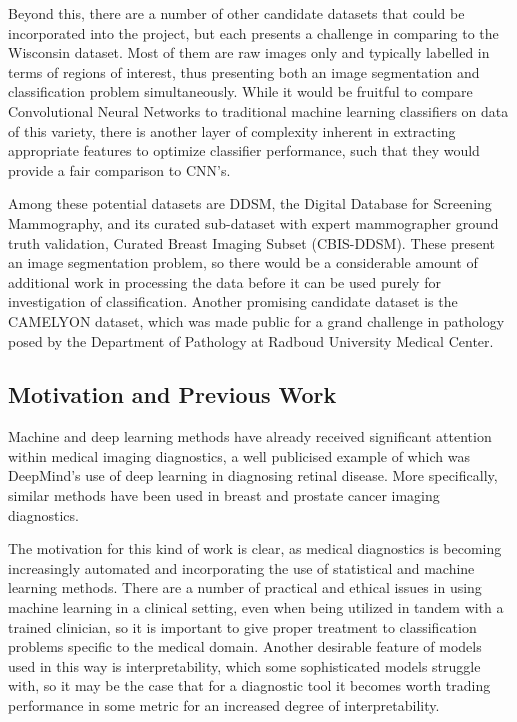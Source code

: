 \documentclass[11pt]{article}
\begin{document}
Beyond this, there are a number of other candidate datasets that could be incorporated into the project, but each presents a challenge in comparing to the Wisconsin dataset. Most of them are raw images only and typically labelled in terms of regions of interest, thus presenting both an image segmentation and classification problem simultaneously. While it would be fruitful to compare Convolutional Neural Networks to traditional machine learning classifiers on data of this variety, there is another layer of complexity inherent in extracting appropriate features to optimize classifier performance, such that they would provide a fair comparison to CNN's. 

Among these potential datasets are DDSM, the Digital Database for Screening Mammography, and its curated sub-dataset with expert mammographer ground truth validation, Curated Breast Imaging Subset (CBIS-DDSM). \cite{lee2017curated} These present an image segmentation problem, so there would be a considerable amount of additional work in processing the data before it can be used purely for investigation of classification. Another promising candidate dataset is the CAMELYON dataset, which was made public for a grand challenge in pathology posed by the Department of Pathology at Radboud University Medical Center. \cite{litjens20181399}

\subsection*{Motivation and Previous Work}
Machine and deep learning methods have already received significant attention within medical imaging diagnostics, a well publicised example of which was DeepMind's use of deep learning in diagnosing retinal disease. \cite{de2018clinically} More specifically, similar methods have been used in breast and prostate cancer imaging diagnostics. \cite{wang2016deep, goldenberg2019new} 

The motivation for this kind of work is clear, as medical diagnostics is becoming increasingly automated and incorporating the use of statistical and machine learning methods. There are a number of practical and ethical issues in using machine learning in a clinical setting, even when being utilized in tandem with a trained clinician, so it is important to give proper treatment to classification problems specific to the medical domain. Another desirable feature of models used in this way is interpretability, which some sophisticated models struggle with, so it may be the case that for a diagnostic tool it becomes worth trading performance in some metric for an increased degree of interpretability.
\end{document}
